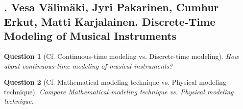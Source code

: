 \documentclass{article}
\newtheorem{question}{Question}
\begin{document}
\subsection{\cite{Valimaki_Pakarinen_Erkut_Karjalainen2006}. {\sc Vesa Välimäki, Jyri Pakarinen, Cumhur Erkut, Matti Karjalainen}. Discrete-Time Modeling of Musical Instruments}
{\sf[283 citations]}
\begin{question}[Cf. Continuous-time modeling vs. Discrete-time modeling]
	How about continuous-time modeling of musical instruments?
\end{question}

\begin{question}[Cf. Mathematical modeling technique vs. Physical modeling technique]
	Compare Mathematical modeling technique vs. Physical modeling technique.
\end{question}
\end{document}

